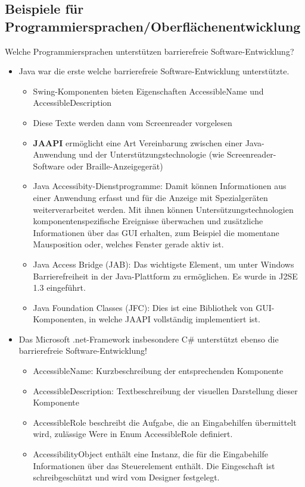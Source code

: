 \documentclass[paper=a4, fontsize=11pt]{scrartcl} %
\numberwithin{equation}{section} %
\numberwithin{figure}{section} %
\numberwithin{table}{section} %
\begin{document}
\subsection{Beispiele für Programmiersprachen/Oberflächenentwicklung}

Welche Programmiersprachen unterstützen barrierefreie Software-Entwicklung?
\begin{itemize}
\item Java war die erste welche barrierefreie Software-Entwicklung unterstützte.
\begin{itemize}
\item Swing-Komponenten bieten Eigenschaften AccessibleName und AccessibleDescription
\item Diese Texte werden dann vom Screenreader vorgelesen
\item \textbf{JAAPI} ermöglicht eine Art Vereinbarung zwischen einer Java-Anwendung und der Unterstützungstechnologie (wie Screenreader-Software oder Braille-Anzeigegerät)
\item Java Accessibity-Dienstprogramme: Damit können Informationen aus einer Anwendung erfasst und für die Anzeige mit Spezialgeräten weiterverarbeitet werden. Mit ihnen können Untersützungstechnologien komponentenspezifische Ereignisse überwachen und zusätzliche Informationen über das GUI erhalten, zum Beispiel die momentane Mausposition oder, welches Fenster gerade aktiv ist.
\item Java Access Bridge (JAB): Das wichtigste Element, um unter Windows Barrierefreiheit in der Java-Plattform zu ermöglichen. Es wurde in J2SE 1.3 eingeführt.
\item Java Foundation Classes (JFC): Dies ist eine Bibliothek von GUI-Komponenten, in welche JAAPI vollständig implementiert ist.
\end{itemize}
\item Das Microsoft .net-Framework insbesondere C\# unterstützt ebenso die barrierefreie Software-Entwicklung!
\begin{itemize}
\item AccessibleName: Kurzbeschreibung der entsprechenden Komponente
\item AccessibleDescription: Textbeschreibung der visuellen Darstellung dieser Komponente
\item AccessibleRole beschreibt die Aufgabe, die an Eingabehilfen übermittelt wird, zulässige Were in Enum AccessibleRole definiert.
\item AccessibilityObject enthält eine Instanz, die für die Eingabehilfe Informationen über das Steuerelement enthält. Die Eingeschaft ist schreibgeschützt und wird vom Designer festgelegt.

\end{itemize}
\end{itemize}
\end{document}
